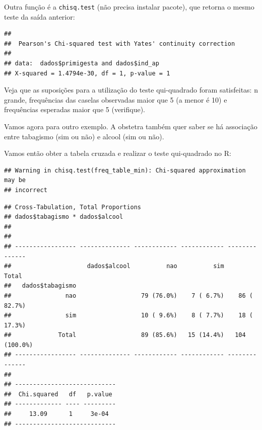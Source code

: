 \documentclass[
]{book}
\newenvironment{Shaded}{\begin{snugshade}}{\end{snugshade}}
\newcommand{\DataTypeTok}[1]{\textcolor[rgb]{0.13,0.29,0.53}{#1}}
\newcommand{\KeywordTok}[1]{\textcolor[rgb]{0.13,0.29,0.53}{\textbf{#1}}}
\newcommand{\NormalTok}[1]{#1}
\newcommand{\OperatorTok}[1]{\textcolor[rgb]{0.81,0.36,0.00}{\textbf{#1}}}
\newcommand{\OtherTok}[1]{\textcolor[rgb]{0.56,0.35,0.01}{#1}}
\newcommand{\StringTok}[1]{\textcolor[rgb]{0.31,0.60,0.02}{#1}}
\begin{document}
Outra função é a \texttt{chisq.test} (não precisa instalar pacote), que retorna o mesmo teste da saída anterior:

\begin{Shaded}
\end{Shaded}

\begin{verbatim}
## 
## 	Pearson's Chi-squared test with Yates' continuity correction
## 
## data:  dados$primigesta and dados$ind_ap
## X-squared = 1.4794e-30, df = 1, p-value = 1
\end{verbatim}

Veja que as suposições para a utilização do teste qui-quadrado foram satisfeitas: n grande, frequências das caselas observadas maior que 5 (a menor é 10) e frequências esperadas maior que 5 (verifique).

Vamos agora para outro exemplo. A obstetra também quer saber se há associação entre tabagismo (sim ou não) e alcool (sim ou não).

Vamos então obter a tabela cruzada e realizar o teste qui-quadrado no R:

\begin{Shaded}
\end{Shaded}

\begin{verbatim}
## Warning in chisq.test(freq_table_min): Chi-squared approximation may be
## incorrect
\end{verbatim}

\begin{verbatim}
## Cross-Tabulation, Total Proportions  
## dados$tabagismo * dados$alcool  
## 
## 
## ----------------- -------------- ------------ ------------ --------------
##                     dados$alcool          nao          sim          Total
##   dados$tabagismo                                                        
##               nao                  79 (76.0%)    7 ( 6.7%)    86 ( 82.7%)
##               sim                  10 ( 9.6%)    8 ( 7.7%)    18 ( 17.3%)
##             Total                  89 (85.6%)   15 (14.4%)   104 (100.0%)
## ----------------- -------------- ------------ ------------ --------------
## 
## ----------------------------
##  Chi.squared   df   p.value 
## ------------- ---- ---------
##     13.09      1     3e-04  
## ----------------------------
\end{verbatim}
\end{document}
